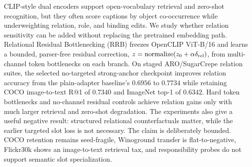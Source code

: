 CLIP-style dual encoders support open-vocabulary retrieval and zero-shot recognition, but they often score captions by object co-occurrence while underweighting relation, role, and binding edits. We study whether relation sensitivity can be added without replacing the pretrained embedding path. Relational Residual Bottlenecking (RRB) freezes OpenCLIP ViT-B/16 and learns a bounded, parser-free residual correction, $z=\mathrm{normalize}(z_0+\alpha\delta_{\mathrm{rel}})$, from multi-channel token bottlenecks on each branch. On staged ARO/SugarCrepe relation suites, the selected no-targeted strong-anchor checkpoint improves relation accuracy from the plain-adapter baseline's $0.6956$ to $0.7734$ while retaining COCO image-to-text R@1 of $0.7340$ and ImageNet top-1 of $0.6342$. Hard token bottlenecks and no-channel residual controls achieve relation gains only with much larger retrieval and zero-shot degradation. The experiments also give a useful negative result: structured relational counterfactuals matter, while the earlier targeted slot loss is not necessary. The claim is deliberately bounded. COCO retention remains seed-fragile, Winoground transfer is flat-to-negative, Flickr30k shows an image-to-text retrieval tax, and responsibility probes do not support semantic slot specialization.

